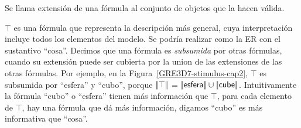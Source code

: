 Se llama extensi\'on de una f\'ormula al conjunto de objetos que la hacen v\'alida.

$\top$ es una f\'ormula que representa la descripci\'on m\'as general, cuya
interpretaci\'on incluye todos los elementos del modelo. Se podr\'ia realizar
como la ER con el sustantivo
``\textsf{cosa}''. Decimos que una f\'ormula es
\emph{subsumida} por otras f\'ormulas, cuando su extensi\'on puede ser cubierta por la
union de las extensiones de las otras f\'ormulas. Por ejemplo, en la
Figura~\ref{GRE3D7-stimulus-cap2}, $\top$ es subsumida por ``\textsf{esfera}'' y
``\textsf{cubo}'', porque $|\!|\top|\!|$ = $|\!|\textsf{esfera}|\!|
\cup |\!|\textsf{cube}|\!|$.
Intuitivamente la f\'ormula ``\textsf{cubo}'' o ``\textsf{esfera}'' tienen m\'as informaci\'on que $\top$, para cada elemento de $\top$, hay una f\'ormula que d\'a m\'as informaci\'on, digamos ``\textsf{cubo}'' es m\'as informativa que ``\textsf{cosa}''.\\

%

